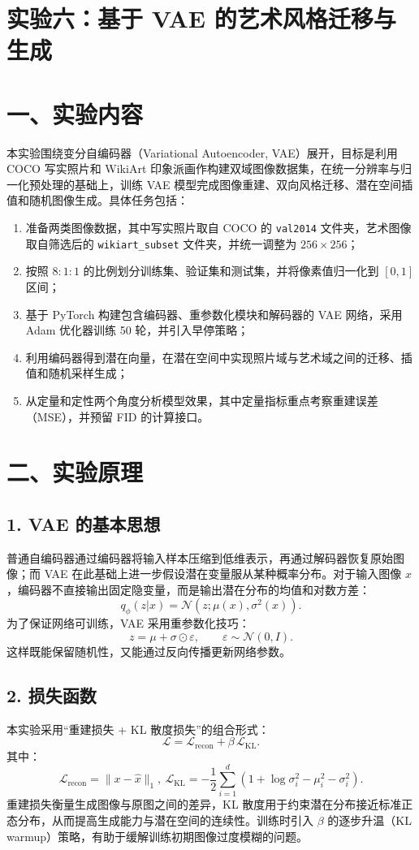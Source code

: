 \documentclass[12pt,a4paper]{ctexart}
\newcommand{\experimenttitle}{实验六：基于 VAE 的艺术风格迁移与生成}
\begin{document}
\section*{\experimenttitle}

\section*{一、实验内容}
本实验围绕变分自编码器（Variational Autoencoder, VAE）展开，目标是利用 COCO 写实照片和 WikiArt 印象派画作构建双域图像数据集，在统一分辨率与归一化预处理的基础上，训练 VAE 模型完成图像重建、双向风格迁移、潜在空间插值和随机图像生成。具体任务包括：
\begin{enumerate}[label=(\arabic*)]
    \item 准备两类图像数据，其中写实照片取自 COCO 的 \texttt{val2014} 文件夹，艺术图像取自筛选后的 \texttt{wikiart\_subset} 文件夹，并统一调整为 $256\times 256$；
    \item 按照 $8:1:1$ 的比例划分训练集、验证集和测试集，并将像素值归一化到 $[0,1]$ 区间；
    \item 基于 PyTorch 构建包含编码器、重参数化模块和解码器的 VAE 网络，采用 Adam 优化器训练 50 轮，并引入早停策略；
    \item 利用编码器得到潜在向量，在潜在空间中实现照片域与艺术域之间的迁移、插值和随机采样生成；
    \item 从定量和定性两个角度分析模型效果，其中定量指标重点考察重建误差（MSE），并预留 FID 的计算接口。
\end{enumerate}

\section*{二、实验原理}

\subsection*{1. VAE 的基本思想}
普通自编码器通过编码器将输入样本压缩到低维表示，再通过解码器恢复原始图像；而 VAE 在此基础上进一步假设潜在变量服从某种概率分布。对于输入图像 $x$，编码器不直接输出固定隐变量，而是输出潜在分布的均值和对数方差：
\[
q_{\phi}(z|x)=\mathcal{N}(z;\mu(x),\sigma^2(x)).
\]
为了保证网络可训练，VAE 采用重参数化技巧：
\[
z=\mu+\sigma\odot\varepsilon,\qquad \varepsilon\sim \mathcal{N}(0,I).
\]
这样既能保留随机性，又能通过反向传播更新网络参数。

\subsection*{2. 损失函数}
本实验采用“重建损失 + KL 散度损失”的组合形式：
\[
\mathcal{L}=\mathcal{L}_{\text{recon}}+\beta\,\mathcal{L}_{\text{KL}}.
\]
其中：
$$\mathcal{L}_{\text{recon}} = \|x-\hat{x}\|_1,\ \mathcal{L}_{\text{KL}} = -\frac{1}{2}\sum_{i=1}^{d}\left(1+\log\sigma_i^2-\mu_i^2-\sigma_i^2\right).$$
重建损失衡量生成图像与原图之间的差异，KL 散度用于约束潜在分布接近标准正态分布，从而提高生成能力与潜在空间的连续性。训练时引入 $\beta$ 的逐步升温（KL warmup）策略，有助于缓解训练初期图像过度模糊的问题。
\end{document}
